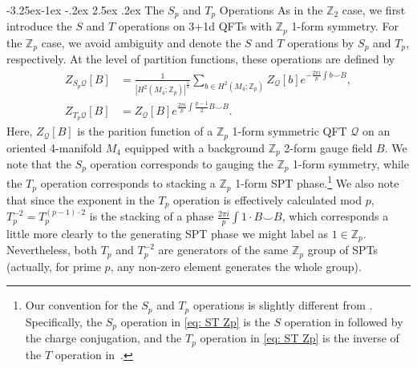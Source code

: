 \documentclass[aps,twocolumn,prx,floatfix,preprintnumbers, nofootinbib,10pt]{revtex4-2}
\makeatletter
\numberwithin{equation}{section}
\theoremstyle{definition}
\theoremstyle{remark}
\theoremstyle{claim}
\newcommand{\Z}{{\mathbb Z}}
\renewcommand\subsubsection{\@startsection{subsubsection}{3}{\z@}%
                                     {-3.25ex\@plus -1ex \@minus -.2ex}%
                                     {2.5ex \@plus .2ex}%
                                     {\centering\itshape\bfseries\small}}
\makeatother
\begin{document}
\subsubsection{The $S_p$ and $T_p$ Operations}
\label{sec: S and T Zp}
As in the $\mathbb{Z}_2$ case, we first introduce the $S$ and $T$ operations on 3+1d QFTs with $\mathbb{Z}_p$ 1-form symmetry.
For the $\mathbb{Z}_p$ case, we avoid ambiguity and denote the $S$ and $T$ operations by $S_p$ and $T_p$, respectively.
At the level of partition functions, these operations are defined by \cite{Choi:2022zal}
\begin{equation}
\begin{aligned}
Z_{S_p\mathcal{Q}}[B] &= \frac{1}{|H^2(M_4; \mathbb{Z}_p)|^{\frac{1}{2}}} \sum_{b \in H^2(M_4; \mathbb{Z}_p)} Z_{\mathcal{Q}}[b] e^{-\frac{2\pi i}{p} \int b \smile B}, \\
Z_{T_p\mathcal{Q}}[B] &= Z_{\mathcal{Q}}[B] e^{\frac{2\pi i}{p} \int \frac{p-1}{2} B \smile B}.
\end{aligned}
\label{eq: ST Zp}
\end{equation}
Here, $Z_{\mathcal{Q}}[B]$ is the parition function of a $\mathbb{Z}_p$ 1-form symmetric QFT $\mathcal{Q}$ on an oriented 4-manifold $M_4$ equipped with a background $\mathbb{Z}_p$ 2-form gauge field $B$.
We note that the $S_p$ operation corresponds to gauging the $\mathbb{Z}_p$ 1-form symmetry, while the $T_p$ operation corresponds to stacking a $\mathbb{Z}_p$ 1-form SPT phase.\footnote{Our convention for the $S_p$ and $T_p$ operations is slightly different from \cite{Choi:2022zal}. Specifically, the $S_p$ operation in \eqref{eq: ST Zp} is the $S$ operation in \cite{Choi:2022zal} followed by the charge conjugation, and the $T_p$ operation in \eqref{eq: ST Zp} is the inverse of the $T$ operation in~\cite{Choi:2022zal}.}
We also note that since the exponent in the $T_p$ operation is effectively calculated mod $p$, $T_p^{-2} = T_p^{(p-1) \cdot 2}$ is the stacking of a phase $\frac{2 \pi i}{p} \int 1 \cdot B \smile B$, which corresponds a little more clearly to the generating SPT phase we might label as $1 \in \Z_p$. Nevertheless, both $T_p$ and $T_p^{-2}$ are generators of the same $\Z_p$ group of SPTs (actually, for prime $p$, any non-zero element generates the whole group).
\end{document}
